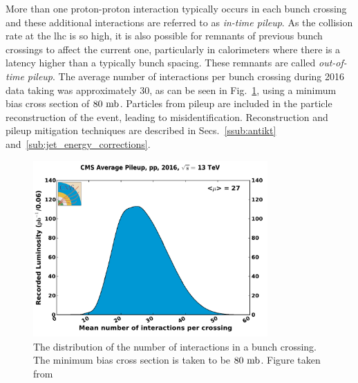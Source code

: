 More than one proton-proton interaction typically occurs in each bunch crossing and these additional interactions are referred to as \textit{in-time pileup}.
As the collision rate at the \acrshort{lhc} is so high, it is also possible for remnants of previous bunch crossings to affect the current one, particularly in calorimeters where there is a latency higher than a typically bunch spacing.
These remnants are called \textit{out-of-time pileup}.
The average number of interactions per bunch crossing during 2016 data taking was approximately 30, as can be seen in Fig.~\ref{fig:CMSPU}, using a minimum bias cross section of $80\mb$.
Particles from pileup are included in the particle reconstruction of the event, leading to misidentification.
Reconstruction and pileup mitigation techniques are described in Secs.~\ref{ssub:antikt} and~\ref{sub:jet_energy_corrections}.
\begin{figure}[htpb]
	\centering
	\includegraphics[width=0.8\textwidth]{Figures/CMSAvePU}
	\caption[The distribution of the number of interactions in a bunch crossing. The minimum bias cross section is taken to be $80\mb$.]{The distribution of the number of interactions in a bunch crossing. The minimum bias cross section is taken to be $80\mb$. Figure taken from~\cite{CMS:CMSLumi} }
	\label{fig:CMSPU}
\end{figure}


